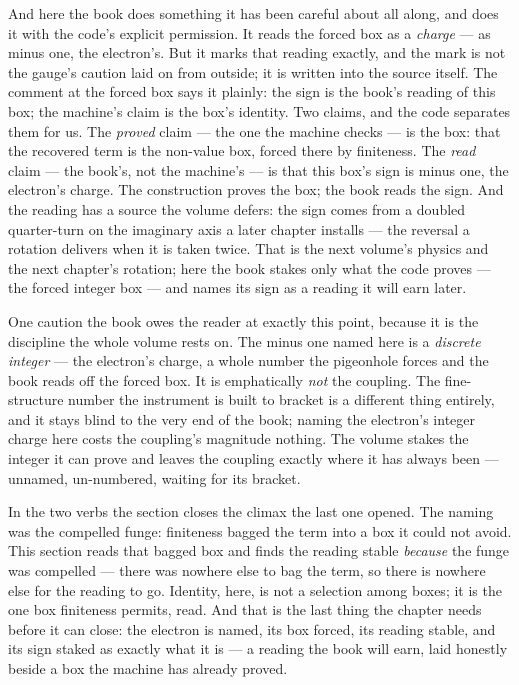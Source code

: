 And here the book does something it has been careful about all along, and does it with the code's explicit permission.
It reads the forced box as a \emph{charge} --- as minus one, the electron's. But it marks that reading exactly, and the
mark is not the gauge's caution laid on from outside; it is written into the source itself. The comment at the forced
box says it plainly: the sign is the book's reading of this box; the machine's claim is the box's identity. Two claims,
and the code separates them for us. The \emph{proved} claim --- the one the machine checks --- is the box: that the
recovered term is the non-value box, forced there by finiteness. The \emph{read} claim --- the book's, not the
machine's --- is that this box's sign is minus one, the electron's charge. The construction proves the box; the book
reads the sign. And the reading has a source the volume defers: the sign comes from a doubled quarter-turn on the
imaginary axis a later chapter installs --- the reversal a rotation delivers when it is taken twice. That is the next
volume's physics and the next chapter's rotation; here the book stakes only what the code proves --- the forced integer
box --- and names its sign as a reading it will earn later.

One caution the book owes the reader at exactly this point, because it is the discipline the whole volume rests on. The
minus one named here is a \emph{discrete integer} --- the electron's charge, a whole number the pigeonhole forces and
the book reads off the forced box. It is emphatically \emph{not} the coupling. The fine-structure number the instrument
is built to bracket is a different thing entirely, and it stays blind to the very end of the book; naming the
electron's integer charge here costs the coupling's magnitude nothing. The volume stakes the integer it can prove and
leaves the coupling exactly where it has always been --- unnamed, un-numbered, waiting for its bracket.

In the two verbs the section closes the climax the last one opened. The naming was the compelled funge: finiteness
bagged the term into a box it could not avoid. This section reads that bagged box and finds the reading stable
\emph{because} the funge was compelled --- there was nowhere else to bag the term, so there is nowhere else for the
reading to go. Identity, here, is not a selection among boxes; it is the one box finiteness permits, read. And that is
the last thing the chapter needs before it can close: the electron is named, its box forced, its reading stable, and
its sign staked as exactly what it is --- a reading the book will earn, laid honestly beside a box the machine has
already proved.

